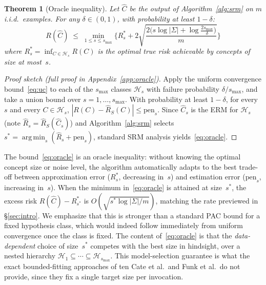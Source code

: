 \documentclass[accepted]{uai2026} %
\newtheorem{theorem}{Theorem}[section]
\theoremstyle{definition}
\theoremstyle{remark}
\DeclareMathOperator*{\argmin}{arg\,min}
\begin{document}
\begin{theorem}[Oracle inequality]\label{thm:oracle}
  Let $\hat{C}$ be the output of
  Algorithm~\ref{alg:srm} on $m$ i.i.d.\ examples.
  For any $\delta \in (0,1)$, with probability at least
  $1 - \delta$:
  \begin{equation}\label{eq:oracle}
    R(\hat{C}) \;\leq\;
    \min_{1 \leq s \leq s_{\max}} \biggl\{
      R_s^* + 2\sqrt{\frac{2\bigl(s \log|\Sigma| +
      \log\frac{2 s_{\max}}{\delta}\bigr)}{m}}
    \biggr\}
  \end{equation}
  where $R_s^* = \inf_{C \in \mathcal{H}_s} R(C)$ is the optimal
  true risk achievable by concepts of size at most~$s$.
\end{theorem}

\begin{proof}[Proof sketch
  (full proof in Appendix~\ref{app:oracle})]
  Apply the uniform convergence
  bound~\eqref{eq:uc} to each of the
  $s_{\max}$ classes $\mathcal{H}_s$ with failure
  probability $\delta/s_{\max}$, and take a union bound over
  $s = 1, \ldots, s_{\max}$. With probability at least
  $1 - \delta$, for every $s$ and every $C \in \mathcal{H}_s$,
  $|R(C) - \hat{R}_S(C)| \leq \mathrm{pen}_s$.
  Since $\hat{C}_s$ is the ERM for $\mathcal{H}_s$
  (note $\hat{R}_s = \hat{R}_S(\hat{C}_s)$) and
  Algorithm~\ref{alg:srm} selects
  $s^* = \argmin_s (\hat{R}_s + \mathrm{pen}_s)$,
  standard SRM analysis yields~\eqref{eq:oracle}.
\end{proof}

The bound~\eqref{eq:oracle} is an oracle
inequality: without knowing the optimal concept size or noise
level, the algorithm automatically adapts to the best trade-off
between approximation error ($R_s^*$, decreasing in~$s$)
and estimation error ($\mathrm{pen}_s$, increasing in~$s$).
When the minimum in~\eqref{eq:oracle} is attained at size~$s^*$,
the excess risk $R(\hat{C}) - R^*_{s^*}$
is $O(\sqrt{s^* \log|\Sigma| / m})$, matching
the rate previewed in \S\ref{sec:intro}.
We emphasize that this is stronger than a standard PAC bound for a
fixed hypothesis class, which would indeed follow immediately from
uniform convergence once the class is fixed. The content
of~\eqref{eq:oracle} is that the \emph{data-dependent} choice of
size~$s^*$ competes with the best size in hindsight, over a nested
hierarchy $\mathcal{H}_1 \subseteq \cdots \subseteq
\mathcal{H}_{s_{\max}}$.
This model-selection guarantee is what the
exact bounded-fitting approaches of ten Cate et al.\ and
Funk et al.\ do not provide, since they fix
a single target size per invocation.
\end{document}
